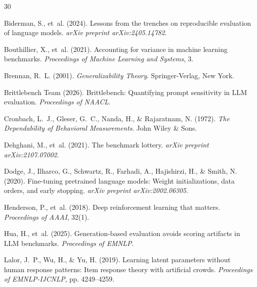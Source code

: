 \documentclass[11pt,twocolumn]{article}
\begin{document}


\begin{thebibliography}{30}

Biderman, S., et~al. (2024).
\newblock Lessons from the trenches on reproducible evaluation of language models.
\newblock \emph{arXiv preprint arXiv:2405.14782}.

Bouthillier, X., et~al. (2021).
\newblock Accounting for variance in machine learning benchmarks.
\newblock \emph{Proceedings of Machine Learning and Systems}, 3.

Brennan, R.~L. (2001).
\newblock \emph{Generalizability Theory}.
\newblock Springer-Verlag, New York.

{Brittlebench Team} (2026).
\newblock Brittlebench: Quantifying prompt sensitivity in LLM evaluation.
\newblock \emph{Proceedings of NAACL}.

Cronbach, L.~J., Gleser, G.~C., Nanda, H., \& Rajaratnam, N. (1972).
\newblock \emph{The Dependability of Behavioral Measurements}.
\newblock John Wiley \& Sons.

Dehghani, M., et~al. (2021).
\newblock The benchmark lottery.
\newblock \emph{arXiv preprint arXiv:2107.07002}.

Dodge, J., Ilharco, G., Schwartz, R., Farhadi, A., Hajishirzi, H., \& Smith, N. (2020).
\newblock Fine-tuning pretrained language models: Weight initializations, data orders, and early stopping.
\newblock \emph{arXiv preprint arXiv:2002.06305}.

Henderson, P., et~al. (2018).
\newblock Deep reinforcement learning that matters.
\newblock \emph{Proceedings of AAAI}, 32(1).

Hua, H., et~al. (2025).
\newblock Generation-based evaluation avoids scoring artifacts in LLM benchmarks.
\newblock \emph{Proceedings of EMNLP}.

Lalor, J.~P., Wu, H., \& Yu, H. (2019).
\newblock Learning latent parameters without human response patterns: Item response theory with artificial crowds.
\newblock \emph{Proceedings of EMNLP-IJCNLP}, pp. 4249--4259.


\end{thebibliography}
\end{document}
